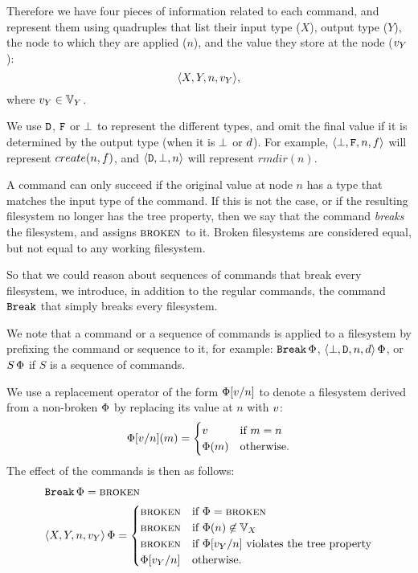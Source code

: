 \begin{mydef}
Therefore we have four pieces of information related to each command,
and represent them using quadruples that list
their input type ($X$), output type ($Y$),
the node to which they are applied ($n$),
and the value they store at the node ($v_Y$):
\[ \langle{X,Y,n,v_Y}\rangle, \]
where $v_Y\in\mathbb{V}_{Y}$.

We use $\mathtt{D}$, $\mathtt{F}$ or $\bot$ to represent the different
types, and omit the final value if it is determined by the output type
(when it is $\bot$ or $d$).
For example, $\langle{\bot,\mathtt{F},n,f}\rangle$ will represent $create(n,f)$,
and $\langle{\mathtt{D},\bot,n}\rangle$ will represent $rmdir(n)$.
\end{mydef}

\bigskip

\noindent
A command can only succeed if the original value at node $n$ has a type that matches
the input type of the command. If this is not the case, or if the resulting
filesystem no longer has the tree property, then we say that the command
{\em breaks} the filesystem, and assigns $\text{\normalfont\scshape{broken}}$ to it.
Broken filesystems are considered equal, but not equal to any working filesystem.

So that we could reason about sequences of commands that break every filesystem, 
we introduce, in addition to the regular commands,
the command $\mathtt{Break}$ that simply breaks every filesystem.

We note that a command or a sequence of commands is applied to a filesystem
by prefixing the command or sequence to it, for example: $\mathtt{Break}\,\Phi$, $\langle{\bot,\mathtt{D},n,d}\rangle\,\Phi$, 
or $S\,\Phi$ if $S$ is a sequence of commands.

\begin{mydef}
We use a replacement operator of the form
$\Phi[v/n]$ to denote a filesystem derived from a non-broken $\Phi$ 
by replacing its value at $n$ with $v$:
\[ \Phi[v/n](m) =
   \begin{cases}
   v &\mbox{if~} m=n\\
   \Phi(m) &\mbox{otherwise.}
   \end{cases}
\]
The effect of the commands is then as follows:
\begin{align*}
&\mathtt{Break}\,\Phi = \text{\normalfont\scshape{broken}} \\
&\langle{X,Y,n,v_Y}\rangle\,\Phi = 
   \begin{cases}
   \text{\normalfont\scshape{broken}} &\mbox{if~} \Phi=\text{\normalfont\scshape{broken}}\\
   \text{\normalfont\scshape{broken}} &\mbox{if~} \Phi(n)\not\in\mathbb{V}_{X}\\
   \text{\normalfont\scshape{broken}} &\mbox{if~} \Phi[v_Y/n] \mbox{~violates the tree property}\\
   \Phi[v_Y/n] &\mbox{otherwise.}
   \end{cases}
\end{align*}
\end{mydef}

